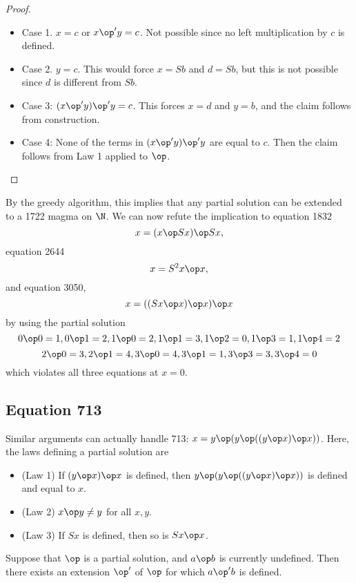 \begin{proof}
\begin{itemize}
\item Case 1.  $x=c$ or $x \op' y = c$.  Not possible since no left multiplication by $c$ is defined.
\item Case 2.  $y=c$.  This would force $x = Sb$ and $d = Sb$, but this is not possible since $d$ is different from $Sb$.
\item Case 3: $(x \op' y) \op' y = c$. This forces $x=d$ and $y=b$, and the claim follows from construction.
\item Case 4: None of the terms in $(x \op' y) \op' y$ are equal to $c$.  Then the claim follows from Law 1 applied to $\op$.
\end{itemize}
\end{proof}

By the greedy algorithm, this implies that any partial solution can be extended to a 1722 magma on $\N$.  We can now refute the implication to equation 1832
$$ x = (x \op Sx) \op Sx,$$
equation 2644
$$ x = S^2 x \op x,$$
and equation 3050,
$$ x = ((Sx \op x) \op x) \op x$$
by using the partial solution
$$ 0 \op 0 = 1, 0 \op 1 = 2, 1 \op 0 = 2, 1 \op 1 = 3, 1 \op 2 = 0, 1 \op 3 = 1, 1 \op 4 = 2$$
$$ 2 \op 0 = 3, 2 \op 1 = 4, 3 \op 0 = 4, 3 \op 1 = 1, 3 \op 3 = 3, 3 \op 4 = 0$$
which violates all three equations at $x=0$.

\subsection{Equation 713}

Similar arguments can actually handle 713: $x = y \op (y \op ((y \op x) \op x))$. Here, the laws defining a partial solution are
\begin{itemize}
\item (Law 1) If $(y \op x) \op x$ is defined, then $y \op (y \op ((y \op x) \op x))$ is defined and equal to $x$.
\item (Law 2) $x \op y \neq y$ for all $x,y$.
\item (Law 3) If $Sx$ is defined, then so is $Sx \op x$.
\end{itemize}

\begin{lemma}[713 extension]\label{713-extension}\leanok{}  Suppose that $\op$ is a partial solution, and $a \op b$ is currently undefined.  Then there exists an extension $\op'$ of $\op$ for which $a \op' b$ is defined.
\end{lemma}

